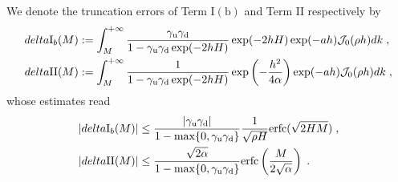 \begin{prop}
We denote the     truncation errors of Term $\mathrm{I(b)}$ and Term $\mathrm{II}$ respectively by
\begin{align*}
  delta \mathrm{I}_b(M)&:=\int_M^{+\infty} \frac{\gamma_{\mathrm{u}}\gamma_{\mathrm{d}}}{1-\gamma_{\mathrm{u}}\gamma_{\mathrm{d}}\exp(-2hH)}  \exp(-2hH)\exp(-ah) \mathcal{J}_0(\rho h)d k \;,\\  
  delta \mathrm{II}(M)&:=\int_M^{+\infty}  \frac{1}{1-\gamma_{\mathrm{u}}\gamma_{\mathrm{d}}\exp(-2hH)}\exp\left(-\frac{h^2}{4\alpha}\right)  \exp(-ah) \mathcal{J}_0(\rho h)d k \;,
\end{align*}
whose estimates read
\begin{align}
    \left\lvert delta \mathrm{I}_b(M)\right\rvert &\leq  \frac{\left\lvert\gamma_{\mathrm{u}}\gamma_{\mathrm{d}}\right\rvert}{1-\max\{0,\gamma_{\mathrm{u}}\gamma_{\mathrm{d}}\}}\frac{1}{\sqrt{\rho H}}\mathrm{erfc}(\sqrt{2HM})\;,\\
    \left\lvert delta \mathrm{II}(M)\right\rvert &\leq \frac{\sqrt{2\alpha} }{1-\max\{0,\gamma_{\mathrm{u}}\gamma_{\mathrm{d}}\}} \mathrm{erfc}\left(\frac{M}{2\sqrt{\alpha}}\right)\;.
\end{align}
\end{prop}
